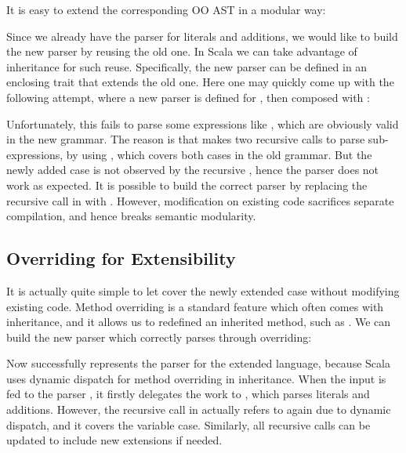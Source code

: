 It is easy to extend the corresponding OO AST in a modular way:


Since we already have the parser for literals and additions, we would
like to build the new parser by reusing the old one. In Scala we can take advantage of inheritance for such reuse. Specifically,
the new parser can be defined in an enclosing trait that extends
the old one. Here one may quickly come up
with the following attempt, where a new parser is defined for , then composed
with :


Unfortunately, this fails to parse some expressions like , which are obviously valid in the new grammar.
The reason is that  makes two recursive calls to parse sub-expressions, by using , which
covers both cases in the old grammar. But the newly added case  is not observed by the recursive ,
hence the parser does not work as expected. It is possible to build the correct parser by replacing the recursive call in  with .
However, modification on existing code sacrifices separate compilation, and hence breaks semantic modularity.

\subsection{Overriding for Extensibility}\label{subsec:overriding}

It is actually quite simple to let  cover the newly
extended case without modifying existing code. Method overriding is a
standard feature which often comes with inheritance, and it allows us
to redefined an inherited method, such as . We can
build the new parser which correctly parses  
through overriding:


Now  successfully represents the parser for the extended language, because Scala uses dynamic dispatch for
method overriding in inheritance. When the input  is fed to the parser , it firstly delegates
the work to , which parses literals and additions. However, the recursive call  in 
actually refers to  again due to dynamic dispatch, and it covers the variable case. Similarly, all recursive calls can be updated to include new extensions if needed.

